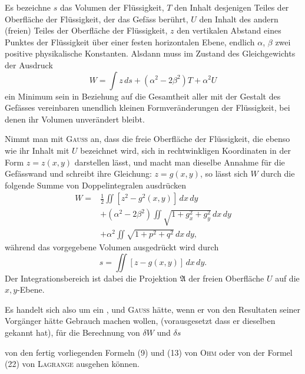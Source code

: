 Es bezeichne $s$ das Volumen der Flüssigkeit, $T$ den Inhalt desjenigen
Teiles der Oberfläche der Flüssigkeit, der das Gefäss berührt, $U$ den Inhalt
des andern (freien) Teiles der Oberfläche der Flüssigkeit, $z$ den vertikalen
Abstand eines Punktes der Flüssigkeit über einer festen horizontalen Ebene,
endlich $\alpha$, $\beta$ zwei positive physikalische Konstanten. Alsdann muss im Zustand
des Gleichgewichts der Ausdruck
\begin{equation*}
W=\int z\,ds+(\alpha^2-2\beta^2)T+\alpha^2U\tag{25}
\end{equation*}
ein Minimum sein in Beziehung auf die Gesamtheit aller mit der Gestalt des
Gefässes vereinbaren unendlich kleinen Formveränderungen der Flüssigkeit,
bei denen ihr Volumen unverändert bleibt.

Nimmt man mit \textsc{Gauss} an, dass die freie Oberfläche der Flüssigkeit, die
ebenso wie ihr Inhalt mit $U$ bezeichnet wird, sich in rechtwinkligen Koordinaten
in der Form $z=z(x,y)$ darstellen lässt, und macht man dieselbe Annahme
für die Gefässwand und schreibt ihre Gleichung: $z=g(x,y)$, so lässt
sich $W$ durch die folgende Summe von Doppelintegralen ausdrücken
\begin{equation*}
\begin{aligned}
W={}&\tfrac12\iint[z^2-g^2(x,y)]\,dx\,dy\\
&+(\alpha^2-2\beta^2)\iint\sqrt{1+g_x^2+g_y^2}\,dx\,dy\\
&+\alpha^2\iint\sqrt{1+p^2+q^2}\,dx\,dy,
\end{aligned}\tag{26}
\end{equation*}
während das vorgegebene Volumen ausgedrückt wird durch
\begin{equation*}
s=\iint[z-g(x,y)]\,dx\,dy.\tag{27}
\end{equation*}
Der Integrationsbereich ist dabei die Projektion $\mathfrak{A}$ der freien Oberfläche $U$
auf die $x,y$-Ebene.

Es handelt sich also um ein , und \textsc{Gauss} hätte, wenn
er von den Resultaten seiner Vorgänger hätte Gebrauch machen wollen, (vorausgesetzt
dass er dieselben gekannt hat), für die Berechnung von $\delta W$ und $\delta s$
\par\clearpage{}
\noindent von den fertig vorliegenden Formeln (9) und (13) von \textsc{Ohm} oder von der Formel
(22) von \textsc{Lagrange} ausgehen können.


